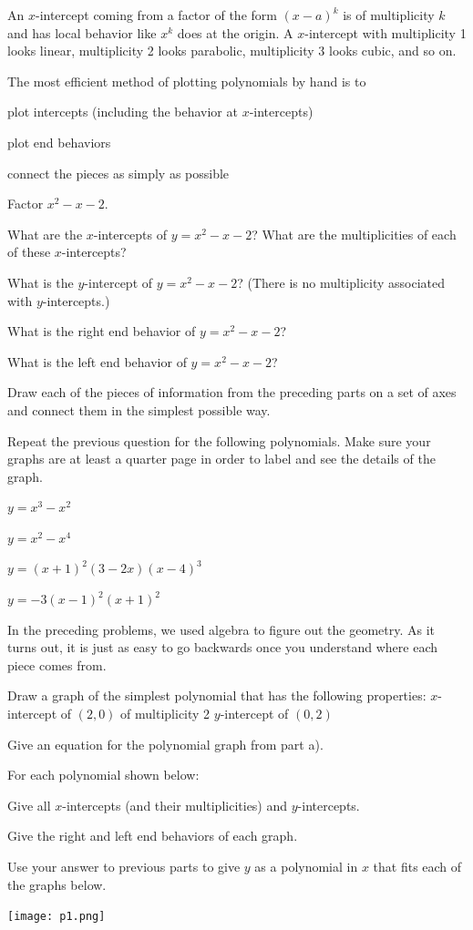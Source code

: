 \begin{info}
An $x$-intercept coming from a factor of the form $(x-a)^k$ is of multiplicity $k$ and has local behavior like $x^k$ does at the origin. A $x$-intercept with multiplicity 1 looks linear, multiplicity 2 looks parabolic, multiplicity 3 looks cubic, and so on.

The most efficient method of plotting polynomials by hand is to
\be
\item plot intercepts (including the behavior at $x$-intercepts)
\item plot end behaviors
\item connect the pieces as simply as possible
\ee
\end{info}

\bq
\be
\item Factor $x^2-x-2$.
\item What are the $x$-intercepts of $y=x^2-x-2$? What are the multiplicities of each of these $x$-intercepts?
\item What is the $y$-intercept of $y=x^2-x-2$? (There is no multiplicity associated with $y$-intercepts.)
\item What is the right end behavior of $y=x^2-x-2$?
\item What is the left end behavior of $y=x^2-x-2$?
\item Draw each of the pieces of information from the preceding parts on a set of axes and connect them in the simplest possible way.
\ee
\eq


\bq Repeat the previous question for the following polynomials. Make sure your graphs are at least a quarter page in order to label and see the details of the graph.
\be
\item $y=x^3-x^2$
\item $y=x^2-x^4$
\item $y=(x+1)^2(3-2x)(x-4)^3$
\item $y=-3(x-1)^2(x+1)^2$
\ee
\eq

In the preceding problems, we used algebra to figure out the geometry. As it turns out, it is just as easy to go backwards once you understand where each piece comes from.
\bq
\be
\item Draw a graph of the simplest polynomial that has the following properties:
\subitem $x$-intercept of $(2,0)$ of multiplicity 2
\subitem $y$-intercept of $(0,2)$
\item Give an equation for the polynomial graph from part a).
\ee
\eq

\bq For each polynomial shown below:
\be
\item Give all $x$-intercepts (and their multiplicities) and $y$-intercepts.
\item Give the right and left end behaviors of each graph.
\item Use your answer to previous parts to give $y$ as a polynomial in $x$ that fits each of the graphs below.
\ee
\begin{center} \texttt{[image: p1.png]} \end{center}

